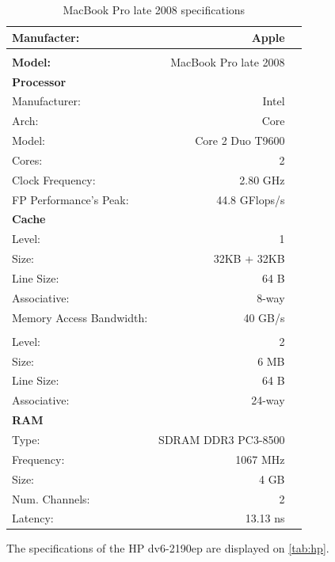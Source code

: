 \documentclass[a4paper,10pt,openright,openbib]{article}
\begin{document}
\begin{table}[!htp]
		\begin{tabular}{lrl}
			\hline 
			\textbf{Manufacter:} & Apple \\
			\hline \\
			\textbf{Model:} & MacBook Pro late 2008 \\
			\hline 
			\textbf{Processor} & & \\
			Manufacturer: & Intel & \\
			Arch: & Core & \\
			Model: & Core 2 Duo T9600 & \\
			Cores: & 2 & \\
			Clock Frequency: & 2.80 GHz & \\
			FP Performance's Peak: & 44.8 GFlops/s & \\
			\hline 
			\textbf{Cache} & & \\
			Level: & 1 & \\
			Size: & 32KB + 32KB & \\
			Line Size: & 64 B & \\
			Associative: & 8-way & \\
			Memory Access Bandwidth: & 40 GB/s & \\
			\\
			Level: & 2 & \\
			Size: & 6 MB & \\
			Line Size: & 64 B & \\
			Associative: & 24-way & \\
			\hline 
			\textbf{RAM} \\
			Type: & SDRAM DDR3 PC3-8500 & \\
			Frequency: & 1067 MHz & \\
			Size: & 4 GB & \\
			Num. Channels: & 2 & \\
			Latency: & 13.13 ns & \\
		\end{tabular}
		\caption{MacBook Pro late 2008 specifications}
		\label{tab:mbp}
\end{table}
The specifications of the HP dv6-2190ep are displayed on \autoref{tab:hp}. \\
\end{document}
